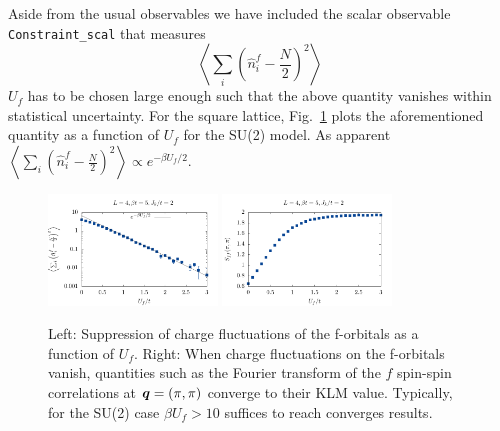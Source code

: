 Aside from the usual observables  we have included  the scalar observable \texttt{Constraint\_scal}    that measures 
\begin{equation}
	\left<    \sum_{i}   \left( \hat{n}_i^f - \frac{N}{2} \right)^2 \right>
\end{equation}
$U_f$   has to be chosen large enough  such that  the above quantity vanishes within statistical uncertainty.  For the square lattice,  Fig.~\ref{Constraint.fig}   plots   the  aforementioned quantity as a function of $U_f$  for the SU(2) model.  As apparent $ \left<    \sum_{i}   \left( \hat{n}_i^f - \frac{N}{2} \right)^2 \right> \propto e^{-\beta U_f/2} $.
\begin{figure}
\center
\includegraphics[width=0.4\textwidth]{Figures/Kondo/Constraint.pdf}
\includegraphics[width=0.4\textwidth]{Figures/Kondo/Spin.pdf}

\caption{  Left:  Suppression of charge fluctuations of the f-orbitals as a function of $U_f$.  Right:   When  charge fluctuations  on the f-orbitals vanish, quantities such as the Fourier transform of the $f$ spin-spin  correlations at $\boldsymbol{q} = (\pi,\pi) $  converge to their KLM value. Typically,  for the SU(2) case $\beta U_f > 10 $  suffices to reach converges results.    }
        \label{Constraint.fig}
\end{figure}


